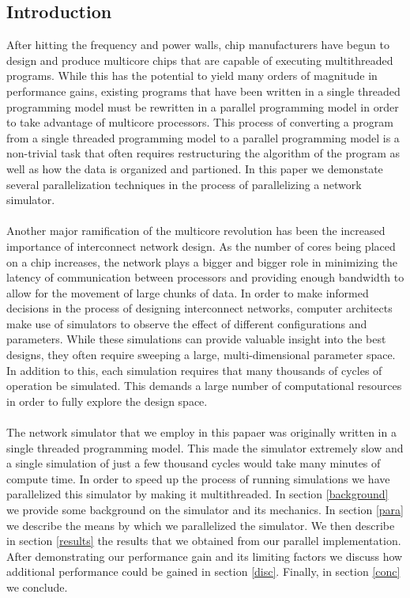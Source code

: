 \documentclass{article}
\begin{document}
\begin{multicols}{2}
\section{Introduction}
After hitting the frequency and power walls, chip manufacturers have begun
to design and produce multicore chips that are capable of executing
multithreaded programs.  While this has the potential to yield many orders
of magnitude in performance gains, existing programs that have been
written in a single threaded programming model must be rewritten in a
parallel programming model in order to take advantage of multicore
processors.  This process of converting a program from a single threaded
programming model to a parallel programming model is a non-trivial task
that often requires restructuring the algorithm of the program as well as
how the data is organized and partioned.  In this paper we demonstate
several parallelization techniques in the process of parallelizing a
network simulator.\\
~\\
Another major ramification of the multicore revolution has been the
increased importance of interconnect network design.  As the number of
cores being placed on a chip increases, the network plays a bigger and
bigger role in minimizing the latency of communication between processors
and providing enough bandwidth to allow for the movement of large chunks
of data.  In order to make informed decisions in the process of designing
interconnect networks, computer architects make use of simulators to
observe the effect of different configurations and parameters.  While
these simulations can provide valuable insight into the best designs, they
often require sweeping a large, multi-dimensional parameter space.  In
addition to this, each simulation requires that many thousands of cycles
of operation be simulated.  This demands a large number of computational
resources in order to fully explore the design space.\\
~\\
The network simulator that we employ in this papaer was originally written
in a single threaded programming model.  This made the simulator extremely
slow and a single simulation of just a few thousand cycles would take many
minutes of compute time.  In order to speed up the process of running
simulations we have parallelized this simulator by making it
multithreaded.  In section \ref{background} we provide some background on
the simulator and its mechanics.  In section \ref{para} we describe the
means by which we parallelized the simulator.  We then describe in section
\ref{results} the results that we obtained from our parallel
implementation.  After demonstrating our performance gain and its limiting
factors we discuss how additional performance could be gained in section
\ref{disc}.  Finally, in section \ref{conc} we conclude.


\end{multicols}
\end{document}
